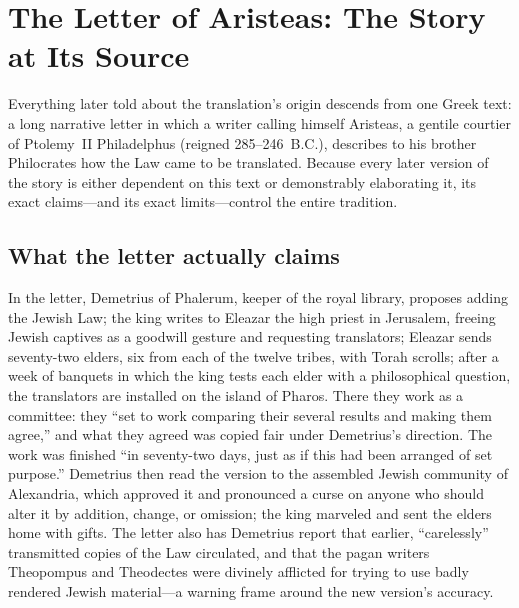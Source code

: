 \section{The Letter of Aristeas: The Story at Its Source}

Everything later told about the translation's origin descends from one Greek
text: a long narrative letter in which a writer calling himself Aristeas, a
gentile courtier of Ptolemy~II Philadelphus (reigned 285--246~B.C.),
describes to his brother Philocrates how the Law came to be translated.
Because every later version of the story is either dependent on this text or
demonstrably elaborating it, its exact claims---and its exact
limits---control the entire tradition.

\subsection{What the letter actually claims}

In the letter, Demetrius of Phalerum, keeper of the royal library, proposes
adding the Jewish Law; the king writes to Eleazar the high priest in
Jerusalem, freeing Jewish captives as a goodwill gesture and requesting
translators; Eleazar sends seventy-two elders, six from each of the twelve
tribes, with Torah scrolls; after a week of banquets in which the king tests
each elder with a philosophical question, the translators are installed on
the island of Pharos. There they work as a committee: they ``set to work
comparing their several results and making them agree,'' and what they
agreed was copied fair under Demetrius's direction. The work was finished
``in seventy-two days, just as if this had been arranged of set purpose.''
Demetrius then read the version to the assembled Jewish community of
Alexandria, which approved it and pronounced a curse on anyone who should
alter it by addition, change, or omission; the king marveled and sent the
elders home with gifts. The letter
also has Demetrius report that earlier, ``carelessly'' transmitted copies of
the Law circulated, and that the pagan writers Theopompus and Theodectes
were divinely afflicted for trying to use badly rendered Jewish material---a
warning frame around the new version's
accuracy.

